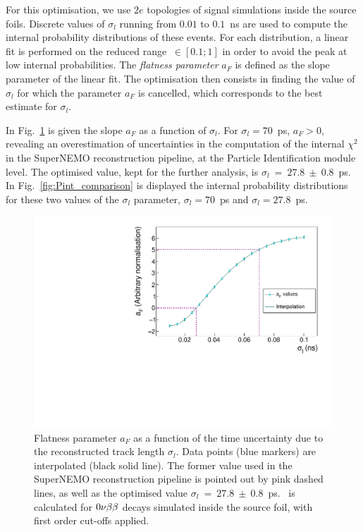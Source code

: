 For this optimisation, we use $2e$ topologies of signal simulations inside the source foils.
Discrete values of $\sigma_{l}$ running from $0.01$ to $0.1$~ns are used to compute the internal probability distributions of these events.
For each distribution, a linear fit is performed on the reduced range \Pint$~\in[0.1;1]$ in order to avoid the peak at low internal probabilities.
The \emph{flatness parameter} $a_{F}$ is defined as the slope parameter of the linear fit.
The optimisation then consists in finding the value of $\sigma_{l}$ for which the parameter $a_{F}$ is cancelled, which corresponds to the best estimate for $\sigma_{l}$.

In Fig.~\ref{fig:flatness} is given the slope $a_{F}$ as a function of $\sigma_{l}$.
For $\sigma_{l}=70$~ps, $a_{F}>0$, revealing an overestimation of uncertainties in the computation of the internal $\chi^{2}$ in the SuperNEMO reconstruction pipeline, at the Particle Identification module level.
The optimised value, kept for the further analysis, is $\sigma_{l}~=~27.8~\pm~0.8$~ps.
In Fig.~\ref{fig:Pint_comparison} is displayed the internal probability distributions for these two values of the $\sigma_{l}$ parameter, $\sigma_{l}=70$~ps and $\sigma_{l}=27.8$~ps.
\begin{figure}[!h]
  \centering
  \includegraphics[width=13cm]{timedifference/fig_timediff/flatness.pdf}
  \caption{Flatness parameter $a_{F}$ as a function of the time uncertainty due to the reconstructed track length $\sigma_{l}$.
    Data points (blue markers) are interpolated (black solid line).
    The former value used in the SuperNEMO reconstruction pipeline is pointed out by pink dashed lines, as well as the optimised value $\sigma_{l}~=~27.8~\pm~0.8$~ps.
    \Pint\ is calculated for $0\nu\beta\beta$ decays simulated inside the source foil, with first order cut-offs applied.
    \label{fig:flatness}}
\end{figure}

